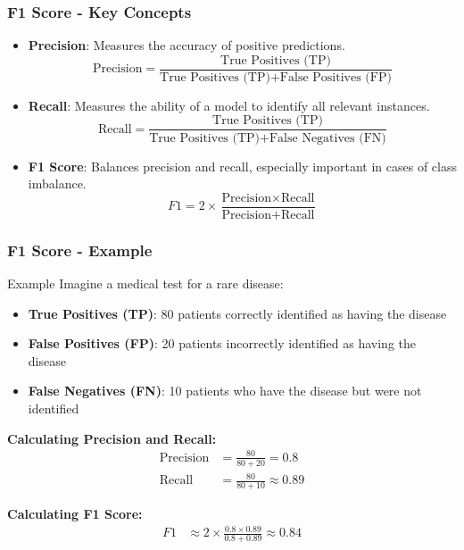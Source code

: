 \documentclass[aspectratio=169]{beamer}
\begin{document}
\begin{frame}[fragile]
    \frametitle{F1 Score - Key Concepts}
    \begin{itemize}
        \item \textbf{Precision}: Measures the accuracy of positive predictions.
        \begin{equation}
            \text{Precision} = \frac{\text{True Positives (TP)}}{\text{True Positives (TP)} + \text{False Positives (FP)}}
        \end{equation}
        
        \item \textbf{Recall}: Measures the ability of a model to identify all relevant instances.
        \begin{equation}
            \text{Recall} = \frac{\text{True Positives (TP)}}{\text{True Positives (TP)} + \text{False Negatives (FN)}}
        \end{equation}

        \item \textbf{F1 Score}: Balances precision and recall, especially important in cases of class imbalance.
        \begin{equation}
            F1 = 2 \times \frac{\text{Precision} \times \text{Recall}}{\text{Precision} + \text{Recall}}
        \end{equation}
    \end{itemize}
\end{frame}

\begin{frame}[fragile]
    \frametitle{F1 Score - Example}
    \begin{block}{Example}
        Imagine a medical test for a rare disease:
        \begin{itemize}
            \item \textbf{True Positives (TP)}: 80 patients correctly identified as having the disease
            \item \textbf{False Positives (FP)}: 20 patients incorrectly identified as having the disease
            \item \textbf{False Negatives (FN)}: 10 patients who have the disease but were not identified
        \end{itemize}
        
        \textbf{Calculating Precision and Recall:}
        \begin{align*}
            \text{Precision} &= \frac{80}{80 + 20} = 0.8 \\
            \text{Recall} &= \frac{80}{80 + 10} \approx 0.89
        \end{align*}

        \textbf{Calculating F1 Score:}
        \begin{align*}
            F1 &\approx 2 \times \frac{0.8 \times 0.89}{0.8 + 0.89} \approx 0.84
        \end{align*}
    \end{block}
\end{frame}
\end{document}
